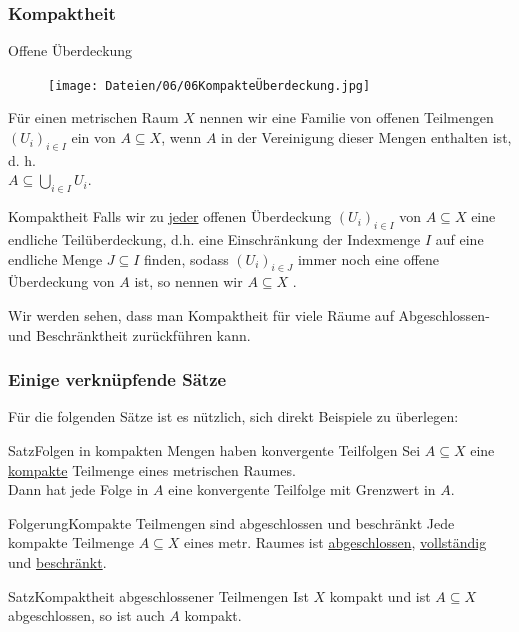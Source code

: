 \subsubsection{Kompaktheit}
\begin{Def}
{Offene Überdeckung}
\begin{figure}
 \vspace{-15pt}
\texttt{[image: Dateien/06/06KompakteÜberdeckung.jpg]}
 \vspace{-15pt}
\end{figure}
Für einen metrischen Raum $X$ nennen wir eine Familie von offenen Teilmengen $(U_i)_{i\in I}$ ein  von $A\subseteq X$, wenn $A$ in der Vereinigung dieser Mengen enthalten ist, d. h.\\
$A\subseteq \bigcup_{i\in I} U_i$.
\end{Def}
\begin{Def}
{Kompaktheit}
Falls wir zu \underline{jeder} offenen Überdeckung $(U_i)_{i\in I}$ von $A\subseteq X$ eine endliche Teilüberdeckung, d.h. eine Einschränkung der Indexmenge $I$ auf eine endliche Menge $J\subseteq I$ finden, sodass $(U_i)_{i\in J}$ immer noch eine offene Überdeckung von $A$ ist, so nennen wir $A\subseteq X$ .
\end{Def}
Wir werden sehen, dass man Kompaktheit für viele Räume auf Abgeschlossen- und Beschränktheit zurückführen kann.
\subsubsection{Einige verknüpfende Sätze}
Für die folgenden Sätze ist es nützlich, sich direkt Beispiele zu überlegen:
\begin{Satz}
{Satz}{Folgen in kompakten Mengen haben konvergente Teilfolgen}
Sei $A\subseteq X$ eine \underline{kompakte} Teilmenge eines metrischen Raumes.\\
Dann hat jede Folge in $A$ eine konvergente Teilfolge mit Grenzwert in $A$.\\
\end{Satz}
\begin{Satz}
{Folgerung}{Kompakte Teilmengen sind abgeschlossen und beschränkt}
Jede kompakte Teilmenge $A\subseteq X$ eines metr. Raumes ist \underline{abgeschlossen}, \underline{vollständig} und \underline{beschränkt}.
\end{Satz}
\begin{Satz}
{Satz}{Kompaktheit abgeschlossener Teilmengen}
Ist $X$ kompakt und ist $A\subseteq X$ abgeschlossen, so ist auch $A$ kompakt.
\end{Satz}

